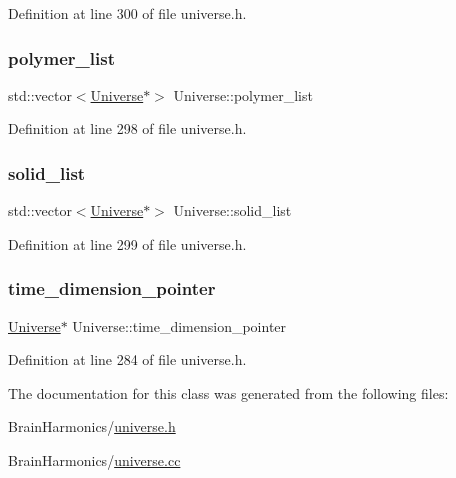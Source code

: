 Definition at line 300 of file universe.\+h.

\mbox{\label{class_universe_a4d898757f2d67ca5ab5d504388d6199a}} 
\subsubsection{\texorpdfstring{polymer\+\_\+list}{polymer\_list}}
{\footnotesize\ttfamily std\+::vector$<$\hyperlink{class_universe}{Universe}$\ast$$>$ Universe\+::polymer\+\_\+list\hspace{0.3cm}{\ttfamily [protected]}}



Definition at line 298 of file universe.\+h.

\mbox{\label{class_universe_a747f9d3cf0b2caada4461cb7b12ea17b}} 
\subsubsection{\texorpdfstring{solid\+\_\+list}{solid\_list}}
{\footnotesize\ttfamily std\+::vector$<$\hyperlink{class_universe}{Universe}$\ast$$>$ Universe\+::solid\+\_\+list\hspace{0.3cm}{\ttfamily [protected]}}



Definition at line 299 of file universe.\+h.

\mbox{\label{class_universe_a3ce4365c727cb6eb5b650146a4188b9b}} 
\subsubsection{\texorpdfstring{time\+\_\+dimension\+\_\+pointer}{time\_dimension\_pointer}}
{\footnotesize\ttfamily \hyperlink{class_universe}{Universe}$\ast$ Universe\+::time\+\_\+dimension\+\_\+pointer}



Definition at line 284 of file universe.\+h.



The documentation for this class was generated from the following files\+:\begin{DoxyCompactItemize}
\item 
Brain\+Harmonics/\hyperlink{universe_8h}{universe.\+h}\item 
Brain\+Harmonics/\hyperlink{universe_8cc}{universe.\+cc}\end{DoxyCompactItemize}

